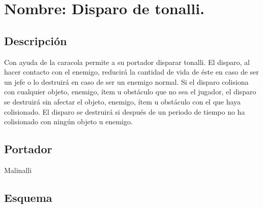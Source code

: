 \section{Nombre: Disparo de tonalli.}\label{hab.disparoT}
\subsection{Descripción}
Con ayuda de la caracola permite a su portador disparar tonalli. El disparo, al hacer contacto con el enemigo, reducirá la cantidad de vida de éste en caso de ser un jefe o lo destruirá en caso de ser un enemigo normal. Si el disparo colisiona con cualquier objeto, enemigo, ítem u obstáculo que no sea el jugador, el disparo se destruirá sin afectar el objeto, enemigo, ítem u obstáculo con el que haya colisionado. El disparo se destruirá si después de un periodo de tiempo no ha colisionado con ningún objeto u enemigo.
\subsection{Portador}
Malinalli
\subsection{Esquema}
			